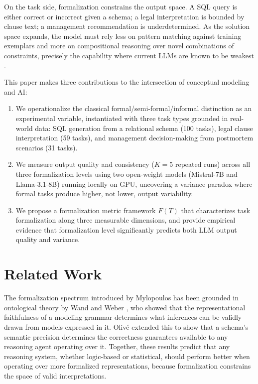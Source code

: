 \documentclass[runningheads]{llncs}
\begin{document}
On the task side, formalization constrains the output space. A SQL query is either correct or incorrect given a schema; a legal interpretation is bounded by clause text; a management recommendation is underdetermined. As the solution space expands, the model must rely less on pattern matching against training exemplars and more on compositional reasoning over novel combinations of constraints, precisely the capability where current LLMs are known to be weakest \cite{dziri2023faith}.

This paper makes three contributions to the intersection of conceptual modeling and AI:
\begin{enumerate}[noitemsep]
  \item We operationalize the classical formal/semi-formal/informal distinction \cite{mylopoulos1992conceptual} as an experimental variable, instantiated with three task types grounded in real-world data: SQL generation from a relational schema (100 tasks), legal clause interpretation (59 tasks), and management decision-making from postmortem scenarios (31 tasks).
  \item We measure output quality and consistency ($K\!=\!5$ repeated runs) across all three formalization levels using two open-weight models (Mistral-7B and Llama-3.1-8B) running locally on GPU, uncovering a variance paradox where formal tasks produce higher, not lower, output variability.
  \item We propose a formalization metric framework $F(T)$ that characterizes task formalization along three measurable dimensions, and provide empirical evidence that formalization level significantly predicts both LLM output quality and variance.
\end{enumerate}

\section{Related Work}
\label{sec:related}

The formalization spectrum introduced by Mylopoulos \cite{mylopoulos1992conceptual} has been grounded in ontological theory by Wand and Weber \cite{wand1990ontological}, who showed that the representational faithfulness of a modeling grammar determines what inferences can be validly drawn from models expressed in it. Oliv\'{e} \cite{olive2007conceptual} extended this to show that a schema's semantic precision determines the correctness guarantees available to any reasoning agent operating over it. Together, these results predict that any reasoning system, whether logic-based or statistical, should perform better when operating over more formalized representations, because formalization constrains the space of valid interpretations.
\end{document}
